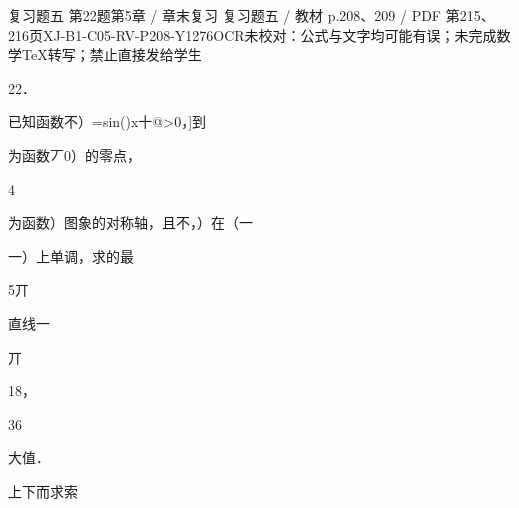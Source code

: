 \begin{bankitem}{复习题五 第22题}{第5章 / 章末复习 复习题五 / 教材 p.208、209 / PDF 第215、216页}{XJ-B1-C05-RV-P208-Y1276}{OCR未校对：公式与文字均可能有误；未完成数学TeX转写；禁止直接发给学生}
\begin{ocrdraft}
\par
22．
\par
已知函数不）=sin()x十@>0，]到
\par
为函数丆0）的零点，
\par
4
\par
为函数）图象的对称轴，且不，）在（一
\par
一）上单调，求的最
\par
5丌
\par
直线一
\par
丌
\par
18，
\par
36
\par
大值．
\par
[教材p.209 / PDF第216页]
\par
上下而求索
\end{ocrdraft}
\end{bankitem}
